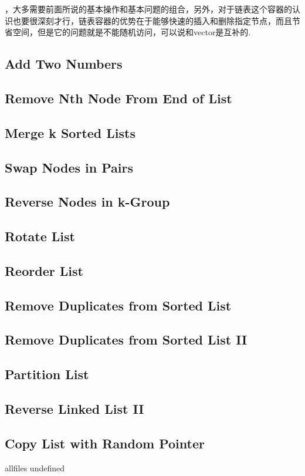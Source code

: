 \documentclass{article}
\begin{document}
\begin{CJK}{UTF8}{gbsn}     %

\else
    
，大多需要前面所说的基本操作和基本问题的组合，另外，对于链表这个容器的认识也要很深刻才行，链表容器的优势在于能够快速的插入和删除指定节点，而且节省空间，但是它的问题就是不能随机访问，可以说和vector是互补的.
\subsection{Add Two Numbers}

\subsection{Remove Nth Node From End of List}

\subsection{Merge k Sorted Lists}

\subsection{Swap Nodes in Pairs}

\subsection{Reverse Nodes in k-Group}

\subsection{Rotate List}

\subsection{Reorder List}

\subsection{Remove Duplicates from Sorted List}

\subsection{Remove Duplicates from Sorted List II}

\subsection{Partition List}

\subsection{Reverse Linked List II}

\subsection{Copy List with Random Pointer}


\fi

\ifx allfiles undefined
\end{CJK}
\end{document}
